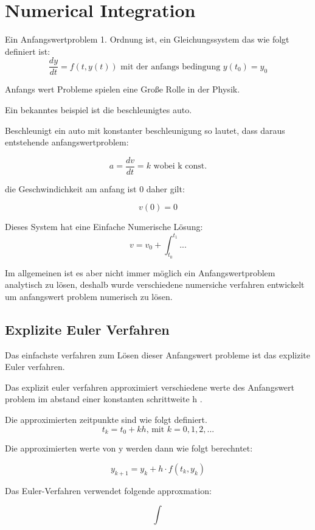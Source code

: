 \chapter{Numerical Integration}




Ein Anfangswertproblem 1. Ordnung ist, ein Gleichungssystem das wie folgt definiert ist:
$$
\frac{dy}{dt} = f(t, y(t)) \text{ mit der anfangs bedingung } y(t_0) = y_0
$$

Anfangs wert Probleme spielen eine Große Rolle in der Physik.

Ein bekanntes beispiel ist die beschleunigtes auto.

Beschleunigt ein auto mit konstanter beschleunigung so lautet, dass daraus entstehende anfangswertproblem:

$$
a = \frac{dv}{dt} = k \text{ wobei k const.}
$$

die Geschwindichkeit am anfang ist 0 daher gilt:

$$
v(0) = 0
$$

Dieses System hat eine Einfache Numerische Lösung:
$$
v = v_0 + \int_{t_0}^{t_1} ...
$$

Im allgemeinen ist es aber nicht immer möglich ein Anfangswertproblem analytisch zu lösen, deshalb wurde verschiedene numersiche verfahren entwickelt um anfangswert problem numerisch zu lösen.

\section{ Explizite Euler Verfahren}


Das einfachste verfahren zum Lösen dieser Anfangswert probleme ist das explizite Euler verfahren.

Das explizit euler verfahren approximiert verschiedene werte des Anfangswert problem 
im abstand einer konstanten schrittweite h .

Die approximierten zeitpunkte sind wie folgt definiert.
$$
t_k = t_0 + kh \text{, mit } k = 0, 1, 2, ...
$$

Die approximierten werte von y werden dann wie folgt berechntet:

$$
y_{k + 1} = y_{k} + h \cdot f(t_k, y_k)
$$

Das Euler-Verfahren verwendet folgende approxmation:

$$
\int_{}
$$










